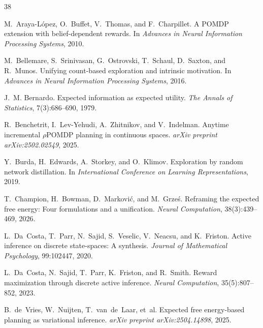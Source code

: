 \documentclass[runningheads]{llncs}
\begin{document}
\begin{thebibliography}{38}

M.~Araya-L\'{o}pez, O.~Buffet, V.~Thomas, and F.~Charpillet.
\newblock A {POMDP} extension with belief-dependent rewards.
\newblock In \emph{Advances in Neural Information Processing Systems}, 2010.

M.~Bellemare, S.~Srinivasan, G.~Ostrovski, T.~Schaul, D.~Saxton, and R.~Munos.
\newblock Unifying count-based exploration and intrinsic motivation.
\newblock In \emph{Advances in Neural Information Processing Systems}, 2016.

J.~M. Bernardo.
\newblock Expected information as expected utility.
\newblock \emph{The Annals of Statistics}, 7(3):686--690, 1979.

R.~Benchetrit, I.~Lev-Yehudi, A.~Zhitnikov, and V.~Indelman.
\newblock Anytime incremental $\rho${POMDP} planning in continuous spaces.
\newblock \emph{arXiv preprint arXiv:2502.02549}, 2025.

Y.~Burda, H.~Edwards, A.~Storkey, and O.~Klimov.
\newblock Exploration by random network distillation.
\newblock In \emph{International Conference on Learning Representations}, 2019.

T.~Champion, H.~Bowman, D.~Markovi\'{c}, and M.~Grze\'{s}.
\newblock Reframing the expected free energy: Four formulations and a unification.
\newblock \emph{Neural Computation}, 38(3):439--469, 2026.

L.~Da~Costa, T.~Parr, N.~Sajid, S.~Veselic, V.~Neacsu, and K.~Friston.
\newblock Active inference on discrete state-spaces: A synthesis.
\newblock \emph{Journal of Mathematical Psychology}, 99:102447, 2020.

L.~Da~Costa, N.~Sajid, T.~Parr, K.~Friston, and R.~Smith.
\newblock Reward maximization through discrete active inference.
\newblock \emph{Neural Computation}, 35(5):807--852, 2023.

B.~de~Vries, W.~Nuijten, T.~van~de~Laar, et~al.
\newblock Expected free energy-based planning as variational inference.
\newblock \emph{arXiv preprint arXiv:2504.14898}, 2025.


\end{thebibliography}
\end{document}
